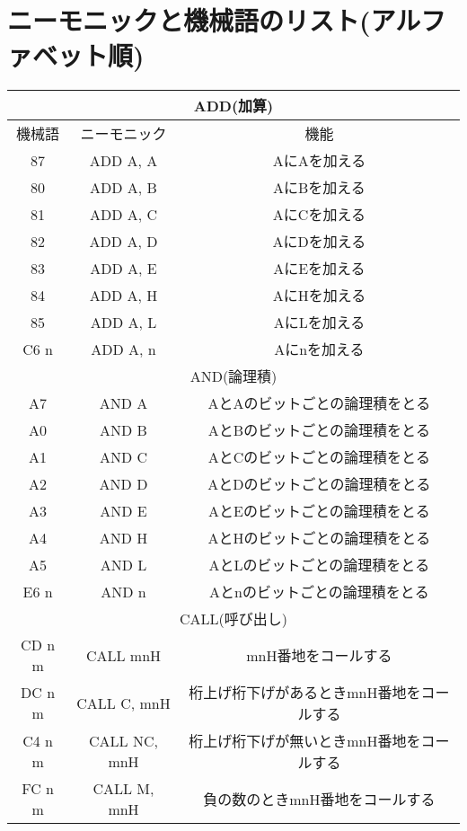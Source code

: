 
\chapter{ニーモニックと機械語のリスト(アルファベット順)}
\footnotesize

\begin{center}
\begin{tabular}{|c|c|c|}
\hline
\multicolumn{3}{|c|}{ADD(加算)}\\
\hline
機械語& ニーモニック& 機能 \\ \hline
87& ADD A, A& AにAを加える\\ \hline
80& ADD A, B& AにBを加える\\ \hline
81& ADD A, C& AにCを加える\\ \hline
82& ADD A, D& AにDを加える\\ \hline
83& ADD A, E& AにEを加える\\ \hline
84& ADD A, H& AにHを加える\\ \hline
85& ADD A, L& AにLを加える\\ \hline
C6 n& ADD A, n& Aにnを加える\\ \hline
\hline
\multicolumn{3}{|c|}{AND(論理積)}\\
\hline
A7& AND A& AとAのビットごとの論理積をとる\\ \hline
A0& AND B& AとBのビットごとの論理積をとる\\ \hline
A1& AND C& AとCのビットごとの論理積をとる\\ \hline
A2& AND D& AとDのビットごとの論理積をとる\\ \hline
A3& AND E& AとEのビットごとの論理積をとる\\ \hline
A4& AND H& AとHのビットごとの論理積をとる\\ \hline
A5& AND L& AとLのビットごとの論理積をとる\\ \hline
E6 n& AND n& Aとnのビットごとの論理積をとる\\ \hline
\hline
\multicolumn{3}{|c|}{CALL(呼び出し)}\\
\hline
CD n m& CALL mnH& mnH番地をコールする \\ \hline
DC n m& CALL C, mnH& 桁上げ桁下げがあるときmnH番地をコールする\\ \hline
C4 n m& CALL NC, mnH& 桁上げ桁下げが無いときmnH番地をコールする\\ \hline
FC n m& CALL M, mnH& 負の数のときmnH番地をコールする\\ \hline

\end{tabular}
\end{center}
